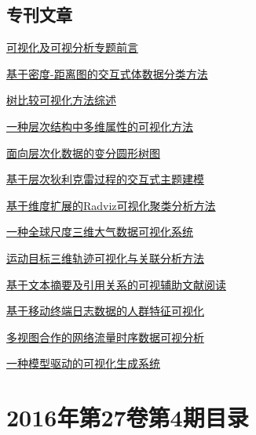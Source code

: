 \documentclass[a4paper]{article}
\begin{document}
\subsection{专刊文章}
\href{http://www.jos.org.cn/ch/reader/download_pdf.aspx?file_no=4963&year_id=2016&quarter_id=5&falg=1}{可视化及可视分析专题前言}

\href{http://www.jos.org.cn/ch/reader/download_pdf.aspx?file_no=4961&year_id=2016&quarter_id=5&falg=1}{基于密度-距离图的交互式体数据分类方法}

\href{http://www.jos.org.cn/ch/reader/download_pdf.aspx?file_no=4957&year_id=2016&quarter_id=5&falg=1}{树比较可视化方法综述}

\href{http://www.jos.org.cn/ch/reader/download_pdf.aspx?file_no=4956&year_id=2016&quarter_id=5&falg=1}{一种层次结构中多维属性的可视化方法}

\href{http://www.jos.org.cn/ch/reader/download_pdf.aspx?file_no=4952&year_id=2016&quarter_id=5&falg=1}{面向层次化数据的变分圆形树图}

\href{http://www.jos.org.cn/ch/reader/download_pdf.aspx?file_no=4955&year_id=2016&quarter_id=5&falg=1}{基于层次狄利克雷过程的交互式主题建模}

\href{http://www.jos.org.cn/ch/reader/download_pdf.aspx?file_no=4951&year_id=2016&quarter_id=5&falg=1}{基于维度扩展的Radviz可视化聚类分析方法}

\href{http://www.jos.org.cn/ch/reader/download_pdf.aspx?file_no=4954&year_id=2016&quarter_id=5&falg=1}{一种全球尺度三维大气数据可视化系统}

\href{http://www.jos.org.cn/ch/reader/download_pdf.aspx?file_no=4953&year_id=2016&quarter_id=5&falg=1}{运动目标三维轨迹可视化与关联分析方法}

\href{http://www.jos.org.cn/ch/reader/download_pdf.aspx?file_no=4962&year_id=2016&quarter_id=5&falg=1}{基于文本摘要及引用关系的可视辅助文献阅读}

\href{http://www.jos.org.cn/ch/reader/download_pdf.aspx?file_no=4958&year_id=2016&quarter_id=5&falg=1}{基于移动终端日志数据的人群特征可视化}

\href{http://www.jos.org.cn/ch/reader/download_pdf.aspx?file_no=4960&year_id=2016&quarter_id=5&falg=1}{多视图合作的网络流量时序数据可视分析}

\href{http://www.jos.org.cn/ch/reader/download_pdf.aspx?file_no=4959&year_id=2016&quarter_id=5&falg=1}{一种模型驱动的可视化生成系统}


\section{\textbf{2016年第27卷第4期目录}}
\end{document}

